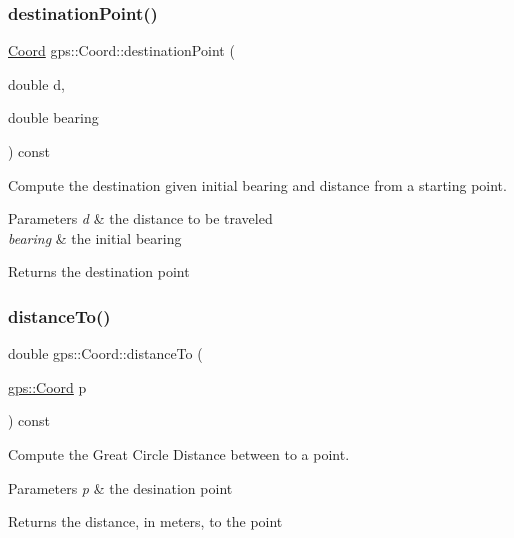\subsubsection{\texorpdfstring{destination\+Point()}{destinationPoint()}}
{\footnotesize\ttfamily \hyperlink{classgps_1_1Coord}{Coord} gps\+::\+Coord\+::destination\+Point (\begin{DoxyParamCaption}\item[{double}]{d,  }\item[{double}]{bearing }\end{DoxyParamCaption}) const}

Compute the destination given initial bearing and distance from a starting point. 
\begin{DoxyParams}{Parameters}
{\em d} & the distance to be traveled \\
\hline
{\em bearing} & the initial bearing \\
\hline
\end{DoxyParams}
\begin{DoxyReturn}{Returns}
the destination point 
\end{DoxyReturn}
\mbox{\label{classgps_1_1Coord_a24d3b9899dc262a40728f7e343781ab6}} 
\subsubsection{\texorpdfstring{distance\+To()}{distanceTo()}}
{\footnotesize\ttfamily double gps\+::\+Coord\+::distance\+To (\begin{DoxyParamCaption}\item[{\hyperlink{classgps_1_1Coord}{gps\+::\+Coord}}]{p }\end{DoxyParamCaption}) const}

Compute the Great Circle Distance between to a point. 
\begin{DoxyParams}{Parameters}
{\em p} & the desination point \\
\hline
\end{DoxyParams}
\begin{DoxyReturn}{Returns}
the distance, in meters, to the point 
\end{DoxyReturn}
\mbox{\label{classgps_1_1Coord_ad832b140a8a39355874e268834d078cd}} 
